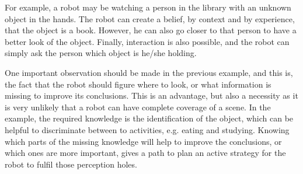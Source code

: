 For example, a robot may be watching a person in the library with an unknown object in the hands. 
The robot can create a belief, by context and by experience, that the object is a book.
However, he can also go closer to that person to have a better look of the object.
Finally, interaction is also possible, and the robot can simply ask the person which object is he/she holding.

One important observation should be made in the previous example, and this is, the fact that the robot should figure where to look, or what information is missing to improve its conclusions. 
This is an advantage, but also a necessity as it is very unlikely that a robot can have complete coverage of a scene.
In the example, the required knowledge is the identification of the object, which can be helpful to discriminate between to activities, e.g. eating and studying. 
Knowing which parts of the missing knowledge will help to improve the conclusions, or which ones are more important, gives a path to plan an active strategy for the robot to fulfil those perception holes.




